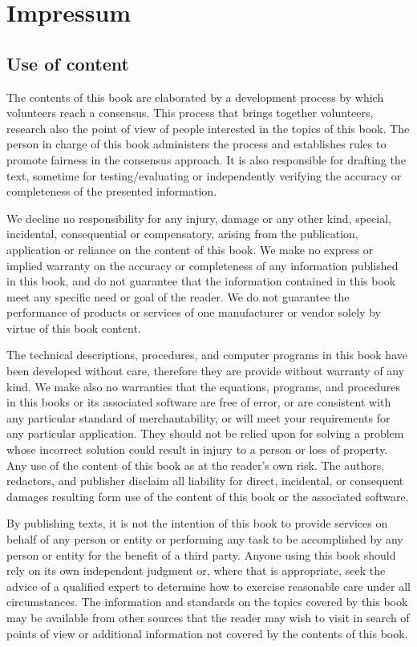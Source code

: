 	\newpage
	\thispagestyle{empty}
	\mbox{}
	\section{Impressum}	
	\subsection{Use of content}

	The contents of this book are elaborated by a development process by which volunteers reach a consensus. This process that brings together volunteers, research also the point of view of people interested in the topics of this book. The person in charge of this book administers the process and establishes rules to promote fairness in the consensus approach. It is also responsible for drafting the text, sometime for testing/evaluating or independently verifying the accuracy or completeness of the presented information.

	We decline no responsibility for any injury, damage or any other kind, special, incidental, consequential or compensatory, arising from the publication, application or reliance on the content of this book. We make no express or implied warranty on the accuracy or completeness of any information published in this book, and do not guarantee that the information contained in this book meet any specific need or goal of the reader. We do not guarantee the performance of products or services of one manufacturer or vendor solely by virtue of this book content.
	
	The technical descriptions, procedures, and computer programs in this book have been developed without care, therefore they are provide without warranty of any kind. We make also no warranties that the equations, programs, and procedures in this books or its associated software are free of error, or are consistent with any particular standard of merchantability, or will meet your requirements for any particular application. They should not be relied upon for solving a problem whose incorrect solution could result in injury to a person or loss of property. Any use of the content of this book as at the reader's own risk. The authors, redactors, and publisher disclaim all liability for direct, incidental, or consequent damages resulting form use of the content of this book or the associated software.

	By publishing texts, it is not the intention of this book to provide services on behalf of any person or entity or performing any task to be accomplished by any person or entity for the benefit of a third party. Anyone using this book should rely on its own independent judgment or, where that is appropriate, seek the advice of a qualified expert to determine how to exercise reasonable care under all circumstances. The information and standards on the topics covered by this book may be available from other sources that the reader may wish to visit in search of points of view or additional information not covered by the contents of this book.

